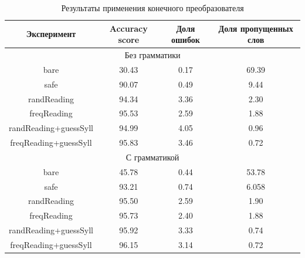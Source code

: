 \documentclass[14pt, a4paper, russian]{report}
\begin{document}
\begin{normalsize}
\begin{table}[H]
	\caption{Результаты применения конечного преобразователя}
	
	\begin{small}
		\begin{center}
			\begin{tabular}{|c|c|c|c|}
				\hline
				     Эксперимент      & Accuracy score & Доля ошибок & Доля пропущенных слов \\ \hline
				\multicolumn{4}{|c|}{Без грамматики}                                         \\ \hline
				        bare          &     30.43      &    0.17     &         69.39         \\ \hline
				        safe          &     90.07      &    0.49     &         9.44          \\ \hline
				     randReading      &     94.34      &    3.36     &         2.30          \\ \hline
				     freqReading      &     95.53      &    2.59     &         1.88          \\ \hline
				randReading+guessSyll &     94.99      &    4.05     &         0.96          \\ \hline
				freqReading+guessSyll &     95.83      &    3.46     &         0.72          \\ \hline
				\multicolumn{4}{|c|}{С грамматикой}                                          \\ \hline
				        bare          &     45.78      &    0.44     &         53.78         \\ \hline
				        safe          &     93.21      &    0.74     &         6.058         \\ \hline
				     randReading      &     95.50      &    2.59     &         1.90          \\ \hline
				     freqReading      &     95.73      &    2.40     &         1.88          \\ \hline
				randReading+guessSyll &     95.92      &    3.33     &         0.74          \\ \hline
				freqReading+guessSyll &     96.15      &    3.14     &         0.72          \\ \hline
			\end{tabular}
		\end{center}
	\end{small}
	\label{table:final_state_result}
	
\end{table}


\end{normalsize}
\end{document}
